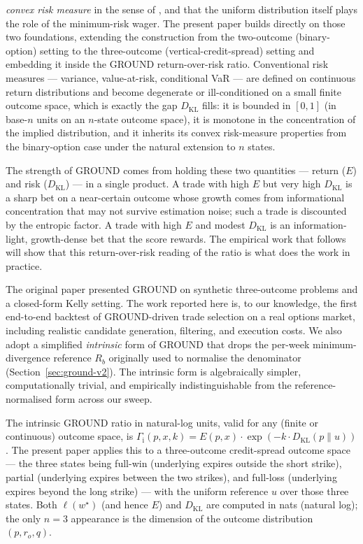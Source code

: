 \documentclass[11pt]{article}
\newcommand{\GROUND}{\Gamma_{\mathrm{i}}}
\begin{document}
\emph{convex risk measure} in the sense of \citet{follmer2002},
and that the uniform distribution itself plays the role of the
minimum-risk wager. The present paper builds directly on those two
foundations, extending the construction from the two-outcome
(binary-option) setting to the three-outcome
(vertical-credit-spread) setting and embedding it inside the GROUND
return-over-risk ratio. Conventional risk measures --- variance,
value-at-risk, conditional VaR --- are defined on continuous return
distributions and become degenerate or ill-conditioned on a small
finite outcome space, which is exactly the gap
$D_{\mathrm{KL}}$ fills: it is bounded in $[0, 1]$ (in base-$n$ units
on an $n$-state outcome space), it is monotone in the concentration
of the implied distribution, and it inherits its convex risk-measure
properties from the binary-option case under the natural extension to
$n$ states.

The strength of GROUND comes from holding these two quantities ---
return ($E$) and risk ($D_{\mathrm{KL}}$) --- in a single product. A
trade with high $E$ but very high $D_{\mathrm{KL}}$ is a sharp bet on
a near-certain outcome whose growth comes from informational
concentration that may not survive estimation noise; such a trade is
discounted by the entropic factor. A trade with high $E$ and modest
$D_{\mathrm{KL}}$ is an information-light, growth-dense bet that the
score rewards. The empirical work that follows will show that this
return-over-risk reading of the ratio is what does the work in
practice.

The original paper presented GROUND on synthetic three-outcome problems
and a closed-form Kelly setting. The work reported here is, to our
knowledge, the first end-to-end backtest of GROUND-driven trade selection
on a real options market, including realistic candidate generation,
filtering, and execution costs. We also adopt a simplified
\emph{intrinsic} form of GROUND that drops the per-week
minimum-divergence reference $R_b$ originally used to normalise the
denominator (Section~\ref{sec:ground-v2}). The intrinsic form is
algebraically simpler, computationally trivial, and empirically
indistinguishable from the reference-normalised form across our sweep.

The intrinsic GROUND ratio in natural-log units, valid for any
(finite or continuous) outcome space, is
$\GROUND(p, x, k) = E(p, x) \cdot \exp(-k \cdot D_{\mathrm{KL}}(p \| u))$.
The present paper applies this to a three-outcome credit-spread
outcome space — the three states being full-win (underlying expires
outside the short strike), partial (underlying expires between the
two strikes), and full-loss (underlying expires beyond the long
strike) — with the uniform reference $u$ over those three states.
Both $\ell(w^\star)$ (and hence $E$) and $D_{\mathrm{KL}}$ are computed
in nats (natural log);
the only $n = 3$
appearance is the dimension of the outcome distribution
$(p, r_o, q)$.
\end{document}

